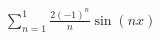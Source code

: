 \documentclass[preview]{standalone}
\begin{document}
\begin{center}
$\sum_{n=1}^{1} \frac{2(-1)^n}{n} \sin(nx)$
\end{center}
\end{document}
